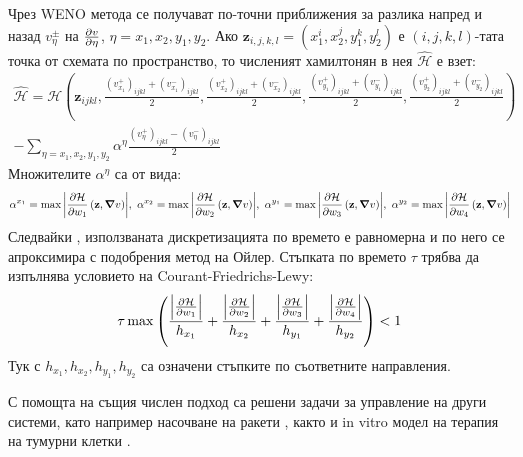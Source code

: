 Чрез WENO метода се получават по-точни приближения за разлика напред и назад $v_{\eta}^{\pm}$ на $\pdv{v}{\eta}$, $\eta = x_1, x_2, y_1, y_2$.
Ако $\mathbf{z}_{i,j,k,l}=(x_1^i, x_2^j, y_1^k, y_2^l)$ е $(i,j,k,l)$-тата точка от схемата по пространство, то численият хамилтонян в нея $\hat{\mathcal{H}}$ е взет:
\begin{multline}
  \hat{\mathcal{H}} = \mathcal{H}\left(\mathbf{z}_{ijkl}, \frac{(v_{x_1}^+)_{ijkl}+(v_{x_1}^-)_{ijkl}}{2}, \frac{(v_{x_2}^+)_{ijkl}+(v_{x_2}^-)_{ijkl}}{2}, \frac{(v_{y_1}^+)_{ijkl}+(v_{y_1}^-)_{ijkl}}{2}, \frac{(v_{y_2}^+)_{ijkl}+(v_{y_2}^-)_{ijkl}}{2}\right) \\ - \sum_{\eta = x_1, x_2, y_1, y_2} \alpha^{\eta} \frac{(v_{\eta}^+)_{ijkl}-(v_{\eta}^-)_{ijkl}}{2}
\end{multline}
Множителите $\alpha^{\eta}$ са от вида:
\begin{equation}
  \alpha^{x_1} = \max \abs{\pdv{\mathcal{H}}{w_1}\left(\mathbf{z}, \grad{v}\right)},~
  \alpha^{x_2} = \max \abs{\pdv{\mathcal{H}}{w_2}\left(\mathbf{z}, \grad{v}\right)},~
  \alpha^{y_1} = \max \abs{\pdv{\mathcal{H}}{w_3}\left(\mathbf{z}, \grad{v}\right)},~
  \alpha^{y_2} = \max \abs{\pdv{\mathcal{H}}{w_4}\left(\mathbf{z}, \grad{v}\right)}
\end{equation}
Следвайки \cite[глава~3.5]{Osher2003}, използваната дискретизацията по времето е равномерна и по него се апроксимира с подобрения метод на Ойлер.
Стъпката по времето $\tau$ трябва да изпълнява условието на Courant-Friedrichs-Lewy:
\begin{equation}
  \tau \max \left(\frac{\abs{\pdv{\mathcal{H}}{w_1}}}{h_{x_1}} + \frac{\abs{\pdv{\mathcal{H}}{w_2}}}{h_{x_2}} + \frac{\abs{\pdv{\mathcal{H}}{w_3}}}{h_{y_1}} + \frac{\abs{\pdv{\mathcal{H}}{w_4}}}{h_{y_2}}\right) < 1
\end{equation}
Тук с $h_{x_1}, h_{x_2}, h_{y_1}, h_{y_2}$ са означени стъпките по съответните направления.

\begin{remark}
  С помощта на същия числен подход са решени задачи за управление на други системи, като например насочване на ракети \cite{Assellaou2016, Assellaou2018}, както и in vitro модел на терапия на тумурни клетки \cite{Carrere2020}.
\end{remark}
